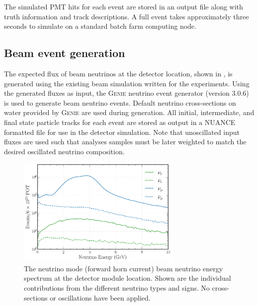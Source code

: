 The simulated PMT hits for each event are stored in an output file along with truth information
and track descriptions. A full event takes approximately three seconds to simulate on a standard
batch farm computing node.

\subsection{Beam event generation} %
\label{sec:chips_monte_carlo_beam} %

The expected flux of beam neutrinos at the \chipsfive detector location, shown in
, is generated using the existing beam simulation written for the \numi
experiments. Using the generated fluxes as input, the \textsc{Genie} neutrino event generator
(version 3.0.6)~\cite{andreopoulos2009, andreopoulos2015} is used to generate beam neutrino
events. Default neutrino cross-sections on water provided by \textsc{Genie} are used during
generation. All initial, intermediate, and final state particle tracks for each event are stored
as output in a NUANCE formatted file for use in the detector simulation. Note that unoscillated
input fluxes are used such that analyses samples must be later weighted to match the desired
oscillated neutrino composition.

\begin{figure} %
    \includegraphics[width=0.7\textwidth]{diagrams/4-chips/flux.pdf}
    \caption[\numi neutrino flux at the \chipsfive detector location]
    {The neutrino mode (forward horn current) \numi beam neutrino energy spectrum at the
        \chipsfive detector module location. Shown are the individual contributions from the
        different neutrino types and signs. No cross-sections or oscillations have been applied.}
    \label{fig:flux}
\end{figure}

